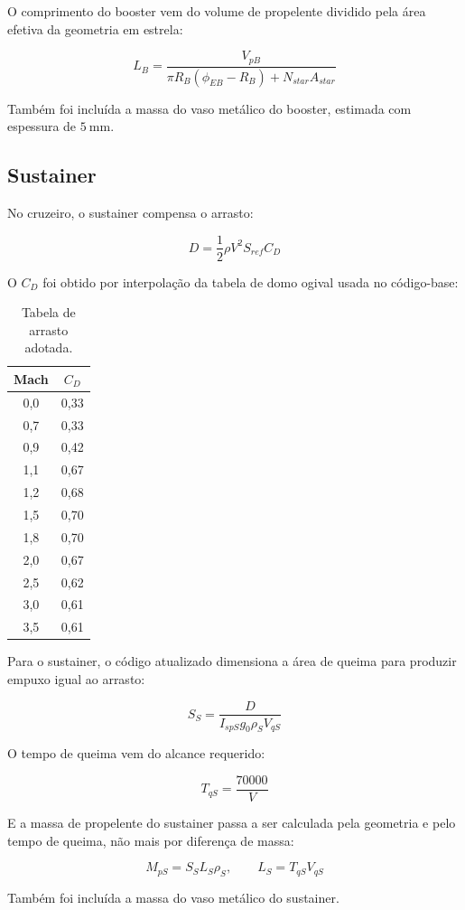 O comprimento do booster vem do volume de propelente dividido pela área efetiva da geometria em estrela:

\begin{equation}
    L_B=\frac{V_{pB}}{\pi R_B(\phi_{EB}-R_B)+N_{star}A_{star}}
\end{equation}

Também foi incluída a massa do vaso metálico do booster, estimada com espessura de \(5~\text{mm}\).

\subsection{Sustainer}

No cruzeiro, o sustainer compensa o arrasto:

\begin{equation}
    D = \frac{1}{2}\rho V^2S_{ref}C_D
\end{equation}

O \(C_D\) foi obtido por interpolação da tabela de domo ogival usada no código-base:

\begin{table}[H]
\centering
\caption{Tabela de arrasto adotada.}
\begin{tabular}{cc}
\toprule
Mach & \(C_D\) \\
\midrule
0{,}0 & 0{,}33 \\
0{,}7 & 0{,}33 \\
0{,}9 & 0{,}42 \\
1{,}1 & 0{,}67 \\
1{,}2 & 0{,}68 \\
1{,}5 & 0{,}70 \\
1{,}8 & 0{,}70 \\
2{,}0 & 0{,}67 \\
2{,}5 & 0{,}62 \\
3{,}0 & 0{,}61 \\
3{,}5 & 0{,}61 \\
\bottomrule
\end{tabular}
\end{table}

Para o sustainer, o código atualizado dimensiona a área de queima para produzir empuxo igual ao arrasto:

\begin{equation}
    S_S = \frac{D}{I_{spS}g_0\rho_SV_{qS}}
\end{equation}

O tempo de queima vem do alcance requerido:

\begin{equation}
    T_{qS}=\frac{70000}{V}
\end{equation}

E a massa de propelente do sustainer passa a ser calculada pela geometria e pelo tempo de queima, não mais por diferença de massa:

\begin{equation}
    M_{pS}=S_SL_S\rho_S, \qquad L_S=T_{qS}V_{qS}
\end{equation}

Também foi incluída a massa do vaso metálico do sustainer.
